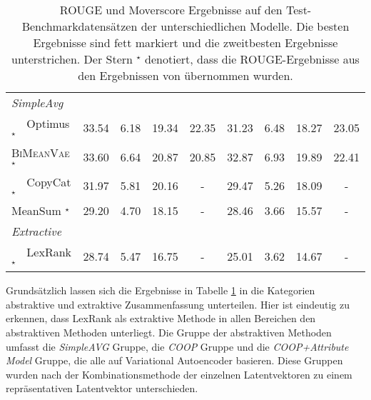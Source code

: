 \begin{table}[!h]
\begin{tabular}{@{}lcccccccc@{}}
    

    \textit{SimpleAvg}                   &         &         &       &      &        &        &        \\
    $\quad$ Optimus  $^{\star}$          & 33.54   & 6.18    & 19.34 & 22.35& 31.23  & 6.48   & 18.27 & 23.05\\
    $\quad$ \textsc{BiMeanVae}$^{\star}$ & 33.60   & 6.64    & 20.87 & 20.85& 32.87  & 6.93   & 19.89 & 22.41\\
    $\quad$ CopyCat  $^{\star}$          & 31.97   & 5.81    & 20.16 &-     & 29.47  & 5.26   & 18.09 & -\\ 
    $\quad$ MeanSum  $^{\star}$          & 29.20   & 4.70    & 18.15 & -    & 28.46  & 3.66   & 15.57 & -\\ \midrule
    \textit{Extractive}                  &         &         &       &      &        &        &       &      \\
    $\quad$ LexRank  $^{\star}$          & 28.74   & 5.47    & 16.75 & -    & 25.01  & 3.62   & 14.67 & -\\ \bottomrule
    \end{tabular}
    \caption{ROUGE und Moverscore Ergebnisse auf den Test-Benchmarkdatensätzen der unterschiedlichen Modelle. Die besten Ergebnisse sind fett markiert und die zweitbesten Ergebnisse unterstrichen.
    Der Stern $^{\star}$ denotiert, dass die ROUGE-Ergebnisse aus den Ergebnissen von \citep{coop} übernommen wurden.
    }
    \label{eval_results}
\end{table}

Grundsätzlich lassen sich die Ergebnisse in Tabelle \ref{eval_results} in die Kategorien abstraktive und extraktive Zusammenfassung unterteilen.
Hier ist eindeutig zu erkennen, dass LexRank als extraktive Methode in allen Bereichen den abstraktiven Methoden unterliegt. 
Die Gruppe der abstraktiven Methoden umfasst die \textit{SimpleAVG} Gruppe, die \textit{COOP} Gruppe und die \textit{COOP+Attribute Model} Gruppe, die alle auf Variational Autoencoder basieren.
Diese Gruppen wurden nach der Kombinationsmethode der einzelnen Latentvektoren zu einem repräsentativen Latentvektor unterschieden.


